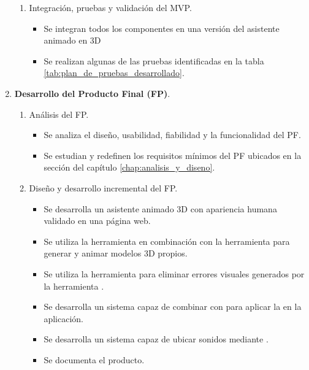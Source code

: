\documentclass{subfiles}
\begin{document}
\begin{enumerate}
\begin{enumerate}
                \item Integración, pruebas y validación del MVP.
                \begin{itemize}
                    \item Se integran todos los componentes en una versión del asistente animado en 3D
                    \item Se realizan algunas de las pruebas identificadas en la tabla \ref{tab:plan_de_pruebas_desarrollado}.
                \end{itemize}
            \end{enumerate}
            
            \item \textbf{Desarrollo del Producto Final (FP)}.

            \begin{enumerate}
                \item Análisis del FP.
                \begin{itemize}
                    \item Se analiza el diseño, usabilidad, fiabilidad y la funcionalidad del PF.
                    \item Se estudian y redefinen los requisitos mínimos del PF ubicados en la sección  del capítulo \ref{chap:analisis_y_diseno}.
                \end{itemize}
                
                \item Diseño y desarrollo incremental del FP.
                \begin{itemize}
                    \item Se desarrolla un asistente animado 3D con apariencia humana validado en una página web.
                    \item Se utiliza la herramienta \makehuman en combinación con la herramienta \blender para generar y animar modelos 3D propios.
                    \item Se utiliza la herramienta \blender para eliminar errores visuales generados por la herramienta \makehuman.
                    \item Se desarrolla un sistema capaz de combinar \webxr con \threejs para aplicar la \ra en la aplicación.
                    \item Se desarrolla un sistema capaz de ubicar sonidos mediante \resonanceaudio.
                    \item Se documenta el producto.
                \end{itemize}
                

\end{enumerate}
\end{enumerate}
\end{document}
